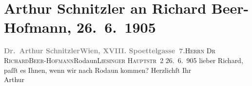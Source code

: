 

         
         \renewcommand{\erwaehntePersonen}{Personen: Richard Beer-Hofmann}
         \renewcommand{\erwaehnteOrte}{Orte: Edmund-Weiß-Gasse, IX., Alsergrund, Liesingerstraße, Rodaun, Wien}
         \renewcommand{\erwaehnteWerke}{}
               \section[Arthur Schnitzler an Richard Beer-Hofmann, 26. 6. 1905]{ Arthur Schnitzler an Richard Beer-Hofmann, 26. 6. 1905}\nopagebreak{}\rehead{ }\begin{ledgroupsized}[t]{13cm}\normalsize\beginnumbering \toendnotes[C]{\smallbreak\pagebreak[2]} 
\toendnotes[C]{\smallbreak}\pstart{}{\pb}\textcolor{gray}{\textbf{Dr. Arthur Schnitzler}}\pend{}\pstart{}\textcolor{gray}{\textbf{Wien, XVIII. Spoettelgasse 7.}}\pend{}{\bigskip}\pstart{}{\pb}\textsc{Herrn Dr Richard}\pend{}\pstart{}\textsc{Beer-Hofmann}\pend{}\pstart{}Rodaun\pend{}\pstart{}\textsc{Liesinger Hauptstr 2}\pend{}{\bigskip}\pstart
           \raggedleft{}{\pb}26. 6. 905\pend
           \pstart
           lieber Richard, paſſt es Ihnen, wenn wir \label{K_L01528_1v}\label{K_L01528_1h} nach Rodaun kommen?\pend
           \pstart
           Herzlichſt Ihr{\\}\spacefill\mbox{Arthur}\pend
           
         
         \endnumbering{}\end{ledgroupsized}  \newcommand{\dateiname}{L01528}\newcommand{\titel}{Arthur Schnitzler an Richard Beer-Hofmann, 26. 6. 1905}\newcommand{\editorInnen}{Martin Anton Müller und Gerd-Hermann Susen}
      